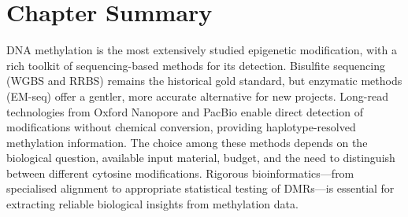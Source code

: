 \section{Chapter Summary}
\label{sec:methylation:summary}

DNA methylation is the most extensively studied epigenetic modification, with a rich toolkit of sequencing-based methods for its detection. Bisulfite sequencing (WGBS and RRBS) remains the historical gold standard, but enzymatic methods (EM-seq) offer a gentler, more accurate alternative for new projects. Long-read technologies from Oxford Nanopore and PacBio enable direct detection of modifications without chemical conversion, providing haplotype-resolved methylation information. The choice among these methods depends on the biological question, available input material, budget, and the need to distinguish between different cytosine modifications. Rigorous bioinformatics---from specialised alignment to appropriate statistical testing of DMRs---is essential for extracting reliable biological insights from methylation data.
